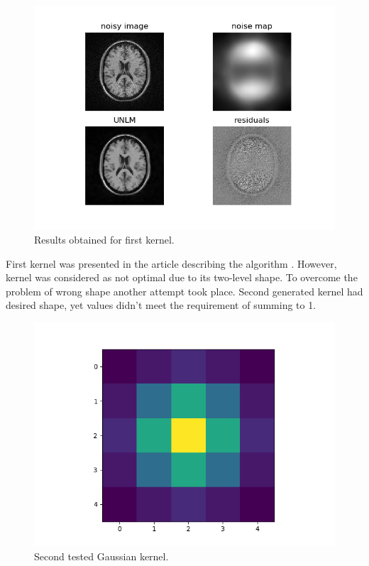 \begin{figure}[H]
	\centering{}
	\includegraphics[scale=1]{figures/module05/gk1results}
	\caption{Results obtained for first kernel.} 
\end{figure}

First kernel was presented in the article describing the algorithm \cite{5a1}. However, kernel was considered as not optimal due to its two-level shape. To overcome the problem of wrong shape another attempt took place. Second generated kernel had desired shape, yet values didn't meet the requirement of summing to 1.

\begin{figure}[H]
	\centering{}
	\includegraphics[scale=0.7]{figures/module05/gk2}
	\caption{Second tested Gaussian kernel.} 
\end{figure}

